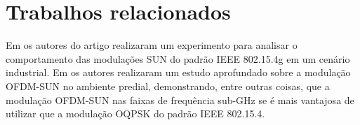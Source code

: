 \section{Trabalhos relacionados}
Em \cite{tuset2020dataset} os autores do artigo realizaram um experimento para analisar o comportamento das modulações SUN do padrão IEEE 802.15.4g em um cenário industrial. Em  \cite{munoz2018overview} os autores realizaram um estudo aprofundado sobre a modulação OFDM-SUN no ambiente predial, demonstrando, entre outras coisas, que a modulação OFDM-SUN nas faixas de frequência sub-GHz se é mais vantajosa de utilizar que a modulação OQPSK do padrão IEEE 802.15.4.
